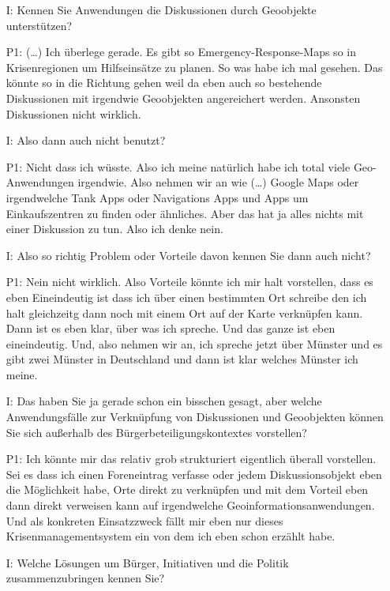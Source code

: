 \begin{itemize}
    \item[I:] Kennen Sie Anwendungen die Diskussionen durch Geoobjekte unterst{\"u}tzen?
    \item[P1:] (\dots) Ich {\"u}berlege gerade. Es gibt so Emergency-Response-Maps so in Krisenregionen um Hilfseins{\"a}tze zu planen. So was habe ich mal gesehen. Das k{\"o}nnte so in die Richtung gehen weil da eben auch so bestehende Diskussionen mit irgendwie Geoobjekten angereichert werden. Ansonsten Diskussionen nicht wirklich.
    \item[I:] Also dann auch nicht benutzt?
    \item[P1:] Nicht dass ich w{\"u}sste. Also ich meine nat{\"u}rlich habe ich total viele Geo-Anwendungen irgendwie. Also nehmen wir an wie (\dots) Google Maps oder irgendwelche Tank Apps oder Navigations Apps und Apps um Einkaufszentren zu finden oder {\"a}hnliches. Aber das hat ja alles nichts mit einer Diskussion zu tun. Also ich denke nein.
    \item[I:] Also so richtig Problem oder Vorteile davon kennen Sie dann auch nicht?
    \item[P1:] Nein nicht wirklich. Also Vorteile k{\"o}nnte ich mir halt vorstellen, dass es eben Eineindeutig ist dass ich {\"u}ber einen bestimmten Ort schreibe den ich halt gleichzeitg dann noch mit einem Ort auf der Karte verkn{\"u}pfen kann. Dann ist es eben klar, {\"u}ber was ich spreche. Und das ganze ist eben eineindeutig. Und, also nehmen wir an, ich spreche jetzt {\"u}ber M{\"u}nster und es gibt zwei M{\"u}nster in Deutschland und dann ist klar welches M{\"u}nster ich meine.
    \item[I:] Das haben Sie ja gerade schon ein bisschen gesagt, aber welche Anwendungsf{\"a}lle zur Verkn{\"u}pfung von Diskussionen und Geoobjekten k{\"o}nnen Sie sich au{\ss}erhalb des B{\"u}rgerbeteiligungskontextes vorstellen?
    \item[P1:] Ich k{\"o}nnte mir das relativ grob strukturiert eigentlich {\"u}berall vorstellen. Sei es dass ich einen Foreneintrag verfasse oder jedem Diskussionsobjekt eben die M{\"o}glichkeit habe, Orte direkt zu verkn{\"u}pfen und mit dem Vorteil eben dann direkt verweisen kann auf irgendwelche Geoinformationsanwendungen. Und als konkreten Einsatzzweck f{\"a}llt mir eben nur dieses Krisenmanagementsystem ein von dem ich eben schon erz{\"a}hlt habe.
    \item[I:] Welche L{\"o}sungen um B{\"u}rger, Initiativen und die Politik zusammenzubringen kennen Sie?

\end{itemize}
